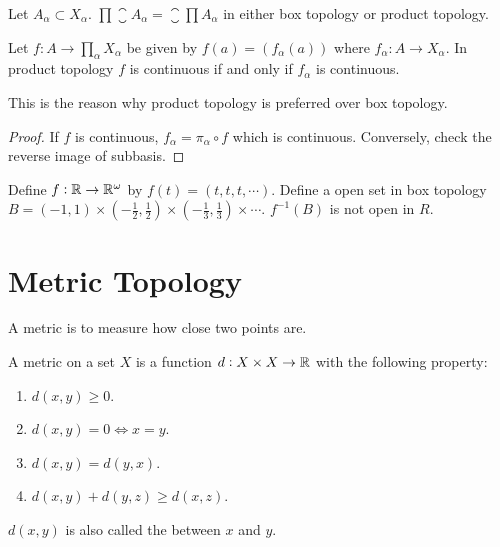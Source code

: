 \begin{theorem}
Let $A_{\alpha} \subset X_{\alpha}$. $\displaystyle \prod \closure{A_{\alpha}} = \closure{\prod A_{\alpha}}$ in either box topology or product topology.
\end{theorem}


\begin{theorem}
Let $\displaystyle f : A \rightarrow \prod_{\alpha} X_{\alpha}$ be given by $f(a) = \left( f_{\alpha}(a) \right)$ where $f_{\alpha} : A \rightarrow X_{\alpha}$. In product topology $f$ is continuous if and only if $f_{\alpha}$ is continuous.

This is the reason why product topology is preferred over box topology.
\end{theorem}
\begin{proof}
    If $f$ is continuous, $f_\alpha = \pi_\alpha \circ f$ which is continuous. Conversely, check the reverse image of subbasis.
\end{proof}

\begin{example}
    Define $f: \mathbb{R} \rightarrow \mathbb{R}^{\omega}$ by $f(t) = (t,t,t, \cdots)$. Define a open set in box topology $B = (-1, 1) \times (- \frac{1}{2}, \frac{1}{2}) \times  (- \frac{1}{3}, \frac{1}{3}) \times \cdots$. $f^{-1}(B)$ is not open in $R$.
\end{example}



\section{Metric Topology}

A metric is to measure how close two points are.

\begin{definition}
    A metric on a set $X$ is a function $d: X \times X \rightarrow \mathbb{R}$ with the following property:
    \begin{enumerate}
        \item $d(x,y) \geq 0$.
        \item $d(x,y) = 0 \Leftrightarrow x = y$.
        \item $d(x,y) = d(y,x)$.
        \item $d(x,y) + d(y,z) \geq d(x,z)$.
    \end{enumerate}
    
    $d(x,y)$ is also called the  between $x$ and $y$.
\end{definition}

